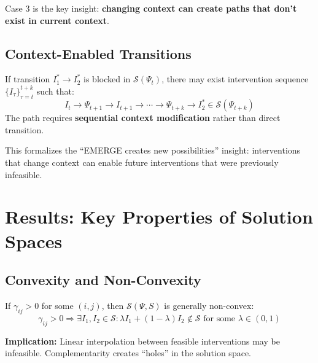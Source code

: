 Case 3 is the key insight: \textbf{changing context can create paths that don't exist in current context}.

\subsection{Context-Enabled Transitions}

\begin{corollary}
If transition $I^*_1 \to I^*_2$ is blocked in $\mathcal{S}(\Psi_t)$, there may exist intervention sequence $\{I_\tau\}_{\tau=t}^{t+k}$ such that:
\begin{equation}
I_t \to \Psi_{t+1} \to I_{t+1} \to \cdots \to \Psi_{t+k} \to I^*_2 \in \mathcal{S}(\Psi_{t+k})
\end{equation}
The path requires \textbf{sequential context modification} rather than direct transition.
\end{corollary}

This formalizes the ``EMERGE creates new possibilities'' insight: interventions that change context can enable future interventions that were previously infeasible.

\section{Results: Key Properties of Solution Spaces}
\label{sec:ss-results}

\subsection{Convexity and Non-Convexity}

\begin{theorem}
If $\gamma_{ij} > 0$ for some $(i,j)$, then $\mathcal{S}(\Psi, S)$ is generally non-convex:
\begin{equation}
\gamma_{ij} > 0 \Rightarrow \exists I_1, I_2 \in \mathcal{S}: \lambda I_1 + (1-\lambda) I_2 \notin \mathcal{S} \text{ for some } \lambda \in (0,1)
\end{equation}
\end{theorem}

\textbf{Implication:} Linear interpolation between feasible interventions may be infeasible. Complementarity creates ``holes'' in the solution space.

